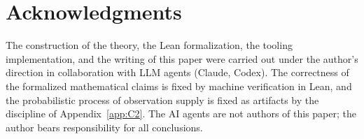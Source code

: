 \documentclass[11pt]{article}
\theoremstyle{plain}
\theoremstyle{definition}
\begin{document}











\section*{Acknowledgments}

The construction of the theory, the Lean formalization, the tooling
implementation, and the writing of this paper were carried out under the
author's direction in collaboration with LLM agents (Claude, Codex). The
correctness of the formalized mathematical claims is fixed by machine
verification in Lean, and the probabilistic process of observation supply is fixed as
artifacts by the discipline of Appendix~\ref{app:C2}. The AI agents are not
authors of this paper; the author bears responsibility for all conclusions.





\end{document}
